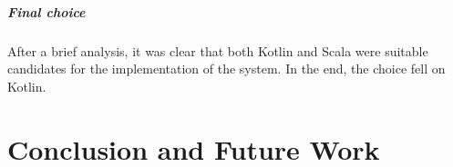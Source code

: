 \documentclass[12pt,a4paper,openright,twoside]{book}
\begin{document}
\paragraph*{Final choice}
After a brief analysis, it was clear that both Kotlin and Scala were suitable candidates for the implementation of the system.
In the end, the choice fell on Kotlin.

\chapter{Conclusion and Future Work}


\backmatter




\end{document}
